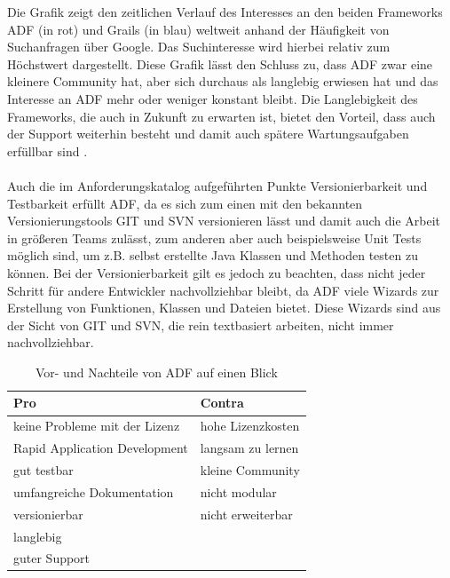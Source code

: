 Die Grafik zeigt den zeitlichen Verlauf des Interesses an den beiden Frameworks ADF (in rot) und Grails (in blau) weltweit anhand der Häufigkeit\autocite{GT2015} von Suchanfragen über Google. Das Suchinteresse wird hierbei relativ zum Höchstwert dargestellt. Diese Grafik lässt den Schluss zu, dass ADF zwar eine kleinere Community hat, aber sich durchaus als langlebig erwiesen hat und das Interesse an ADF mehr oder weniger konstant bleibt. Die Langlebigkeit des Frameworks, die auch in Zukunft zu erwarten ist, bietet den Vorteil, dass auch der Support weiterhin besteht und damit auch spätere Wartungsaufgaben erfüllbar sind \autocite[S.214]{EFCMW2013}.\\\\
Auch die im Anforderungskatalog aufgeführten Punkte Versionierbarkeit und Testbarkeit erfüllt ADF, da es sich zum einen mit den bekannten Versionierungstools GIT und SVN versionieren lässt und damit auch die Arbeit in größeren Teams zulässt, zum anderen aber auch beispielsweise Unit Tests möglich sind, um z.B. selbst erstellte Java Klassen und Methoden testen zu können. Bei der Versionierbarkeit gilt es jedoch zu beachten, dass nicht jeder Schritt für andere Entwickler nachvollziehbar bleibt, da ADF viele Wizards zur Erstellung von Funktionen, Klassen und Dateien bietet. Diese Wizards sind aus der Sicht von GIT und SVN, die rein textbasiert arbeiten, nicht immer nachvollziehbar.
\begin{table}[H]
  \centering
    \begin{tabular}{l l}
	  \toprule
	  Pro & Contra \\
	  \midrule
	  keine Probleme mit der Lizenz &  hohe Lizenzkosten \\
	  Rapid Application Development &  langsam zu lernen \\
	  gut testbar &  kleine Community \\
	  umfangreiche Dokumentation &  nicht modular \\
	  versionierbar &  nicht erweiterbar  \\
	  langlebig & \\
	  guter Support & \\
	  \bottomrule
    \end{tabular}
    \caption{Vor- und Nachteile von ADF auf einen Blick}
  \end{table}

